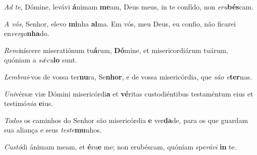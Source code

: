 \begin{greenumerate}


  \ifbook%
    \setcounter{enumi}{1}
  \else
    \item \textit{Ad te}, Dómine, levávi \textbf{á}nimam \textbf{me}am, {\GreStar} De\-us meus, in te confído, non \textit{eru}\textbf{bés}cam. 
  \fi

  \switchcolumn%

  \ifbook%
    \setcounter{enumi}{1}
  \else
    \item \textit{A vós}, Senhor, elevo \textbf{mi}nha \textbf{al}ma. {\GreStar} Em vós, meu Deus, eu confio, não ficarei en\textit{vergo}\textbf{nha}\-do. 
  \fi

  \switchcolumn*


  \item \textit{Remi}níscere miseratiónum tu\textbf{á}rum, \textbf{Dó}mi\-ne, {\GreStar} et misericordiárum tuárum, quóniam a \textit{sǽcu}\textbf{lo} sunt. 

  \switchcolumn%

  \item \textit{Lembrai}-vos de vossa ter\textbf{nu}ra, Se\textbf{nhor}, {\GreStar} e de vossa misericórdia, que \textit{são e}\textbf{ter}nas. 

  \switchcolumn*


  \item \textit{Uni}vérsæ viæ Dómini misericórdi\textbf{a} et \textbf{vé}ri\-tas {\GreStar} custodiéntibus testaméntum eius et testimó\textit{nia} \textbf{e}ius. 

  \switchcolumn%

  \item \textit{Todos} os caminhos do Senhor são misericórdia \textbf{e} ver\textbf{da}\-de, {\GreStar} para os que guardam sua aliança e seus \textit{teste}\textbf{mu}\-nhos. 

  \switchcolumn*


  \item \textit{Custó}di ánimam meam, et \textbf{é}ru\textbf{e} me; {\GreStar} non erubéscam, quóniam spe\textit{rávi} \textbf{in} te. 


\end{greenumerate}
